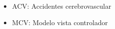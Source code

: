 \begin{abbidx}
    \begin{itemize}
        \item ACV: Accidentes cerebrovascular 
        \item MCV: Modelo vista controlador
    \end{itemize}
\end{abbidx}